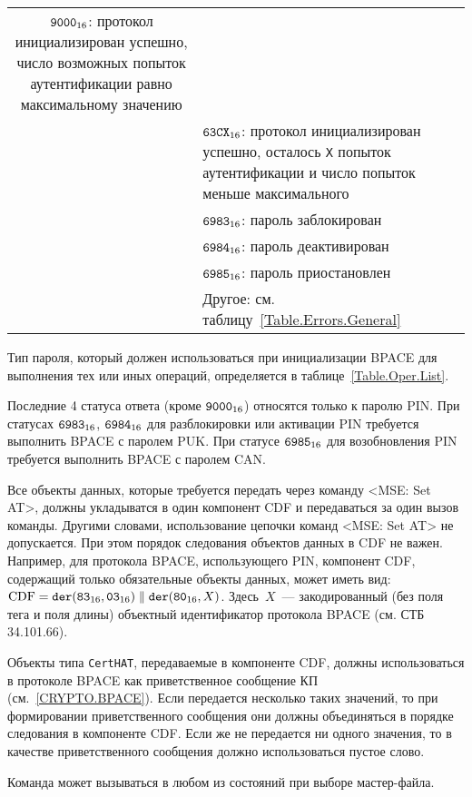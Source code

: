 \begin{table}[H]
\begin{tabular}{|c|p{14cm}|}
$\texttt{9000}_{16}$: протокол инициализирован успешно,
число возможных попыток аутентификации равно максимальному значению\\
\cline{2-2}
& $\texttt{63CX}_{16}$: протокол инициализирован успешно,
осталось \texttt{X} попыток аутентификации и число попыток меньше максимального\\
\cline{2-2}
& $\texttt{6983}_{16}$: пароль заблокирован\\
\cline{2-2}
& $\texttt{6984}_{16}$: пароль деактивирован\\
\cline{2-2}
& $\texttt{6985}_{16}$: пароль приостановлен\\
\cline{2-2}
& Другое: см. таблицу~\ref{Table.Errors.General} \\
\hline
\end{tabular}
\end{table}

Тип пароля, который должен использоваться при 
инициализации BPACE для выполнения тех или иных
операций, определяется в таблице~\ref{Table.Oper.List}.

Последние 4 статуса ответа (кроме $\texttt{9000}_{16}$) относятся только к паролю PIN.
При статусах $\texttt{6983}_{16}$, $\texttt{6984}_{16}$ для разблокировки или активации PIN 
требуется выполнить BPACE с паролем PUK. При статусе $\texttt{6985}_{16}$ для 
возобновления PIN требуется выполнить BPACE с паролем CAN.

Все объекты данных, которые требуется передать через команду <MSE: Set AT>,
должны укладыватся в один компонент CDF и передаваться за один вызов команды.
Другими словами, использование цепочки команд <MSE: Set AT> не допускается. 
При этом порядок следования объектов данных в CDF не важен. 
Например, для протокола BPACE, использующего PIN, компонент CDF, 
содержащий только обязательные объекты данных, может иметь вид: 
$\text{CDF} = \texttt{der}(\texttt{83}_{16},\texttt{03}_{16}) \parallel \texttt{der}(\texttt{80}_{16}, X)$. 
Здесь~$X$~--- закодированный (без поля тега и поля длины) объектный 
идентификатор протокола BPACE (см. СТБ 34.101.66).

Объекты типа \verb|CertHAT|, передаваемые в компоненте CDF, 
должны использоваться в протоколе BPACE как приветственное сообщение КП
(см.~\ref{CRYPTO.BPACE}).
%
Если передается несколько таких значений, то при формировании приветственного
сообщения они должны объединяться в порядке следования в компоненте CDF. Если же
не передается ни одного значения, то в качестве приветственного сообщения должно
использоваться пустое слово.
 
Команда может вызываться в любом из состояний при выборе мастер-файла.

